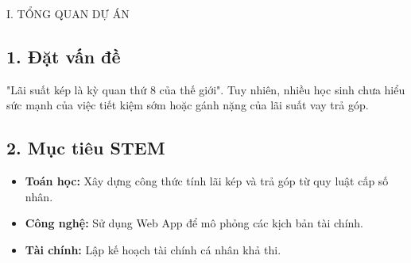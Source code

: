 \documentclass[12pt,a4paper]{article}
\begin{document}
\begin{sectionbox}{I. TỔNG QUAN DỰ ÁN}
\subsection*{1. Đặt vấn đề}
"Lãi suất kép là kỳ quan thứ 8 của thế giới". Tuy nhiên, nhiều học sinh chưa hiểu sức mạnh của việc tiết kiệm sớm hoặc gánh nặng của lãi suất vay trả góp.

\subsection*{2. Mục tiêu STEM}
\begin{itemize}
    \item \textbf{Toán học:} Xây dựng công thức tính lãi kép và trả góp từ quy luật cấp số nhân.
    \item \textbf{Công nghệ:} Sử dụng Web App để mô phỏng các kịch bản tài chính.
    \item \textbf{Tài chính:} Lập kế hoạch tài chính cá nhân khả thi.
\end{itemize}
\end{sectionbox}
\end{document}
